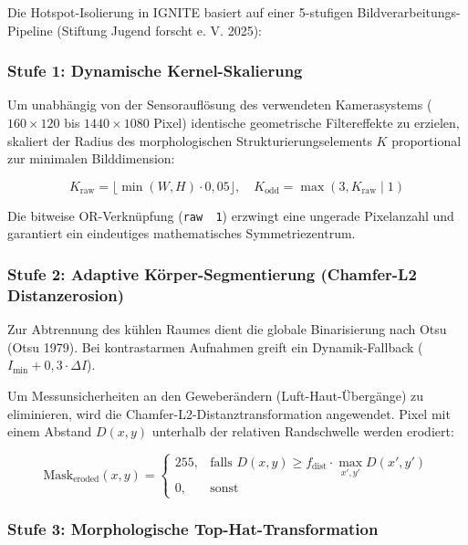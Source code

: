 \documentclass[
  11pt,
]{article}
\begin{document}
Die Hotspot-Isolierung in IGNITE basiert auf einer 5-stufigen
Bildverarbeitungs-Pipeline (Stiftung Jugend forscht e. V. 2025):

\subsubsection{Stufe 1: Dynamische
Kernel-Skalierung}\label{stufe-1-dynamische-kernel-skalierung}

Um unabhängig von der Sensorauflösung des verwendeten Kamerasystems
(\(160 \times 120\) bis \(1440 \times 1080\) Pixel) identische
geometrische Filtereffekte zu erzielen, skaliert der Radius des
morphologischen Strukturierungselements \(K\) proportional zur minimalen
Bilddimension:

\[ K_{\text{raw}} = \lfloor \min(W, H) \cdot 0{,}05 \rfloor, \quad K_{\text{odd}} = \max(3, K_{\text{raw}} \mid 1) \]

Die bitweise OR-Verknüpfung (\texttt{raw\ \textbar{}\ 1}) erzwingt eine
ungerade Pixelanzahl und garantiert ein eindeutiges mathematisches
Symmetriezentrum.

\subsubsection{Stufe 2: Adaptive Körper-Segmentierung (Chamfer-L2
Distanzerosion)}\label{stufe-2-adaptive-kuxf6rper-segmentierung-chamfer-l2-distanzerosion}

Zur Abtrennung des kühlen Raumes dient die globale Binarisierung nach
Otsu (Otsu 1979). Bei kontrastarmen Aufnahmen greift ein
Dynamik-Fallback (\(I_{\min} + 0{,}3 \cdot \Delta I\)).

Um Messunsicherheiten an den Geweberändern (Luft-Haut-Übergänge) zu
eliminieren, wird die Chamfer-L2-Distanztransformation angewendet. Pixel
mit einem Abstand \(D(x,y)\) unterhalb der relativen Randschwelle werden
erodiert:

\[ \text{Mask}_{\text{eroded}}(x,y) = \begin{cases} 255, & \text{falls } D(x,y) \ge f_{\text{dist}} \cdot \max_{x',y'} D(x',y') \\ 0, & \text{sonst} \end{cases} \]

\subsubsection{Stufe 3: Morphologische
Top-Hat-Transformation}\label{stufe-3-morphologische-top-hat-transformation}
\end{document}
